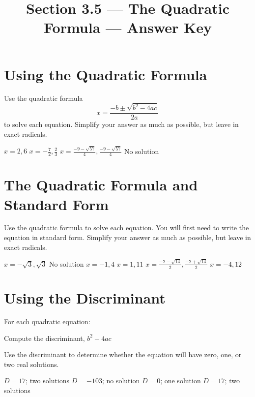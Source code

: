 

\title{Section 3.5 --- The Quadratic Formula --- Answer Key}


\maketitle
\section*{Using the Quadratic Formula}
Use the quadratic formula
\[
x=\frac{-b\pm\sqrt{b^2-4ac}}{2a}
\]
to solve each equation.  Simplify your answer as much as possible, but leave in exact radicals.
\begin{smenum}
\mitemxxxx
{$x=2,6$}
{$x=-\frac{7}{2},\frac{2}{3}$}
{$x=\frac{-9-\sqrt{57}}{4},\frac{-9-\sqrt{57}}{4}$}
{No solution}
\end{smenum}

\section*{The Quadratic Formula and Standard Form}
Use the quadratic formula to solve each equation.  You will first need to write the equation in standard form.  Simplify your answer as much as possible, but leave in exact radicals.
\begin{smenum}
\mitemxxxx
{$x=-\sqrt{3},\sqrt{3}$}
{No solution}
{$x=-1,4$}
{$x=1,11$}
\mitemxx
{$x=\frac{-2-\sqrt{14}}{2},\frac{-2+\sqrt{14}}{2}$}
{$x=-4,12$}
\end{smenum}

\section*{Using the Discriminant}
For each quadratic equation:
\begin{clist}
\item Compute the discriminant, $b^2-4ac$
\item Use the discriminant to determine whether the equation will have zero, one, or two real solutions.
\end{clist}
\begin{smenum}
\mitemxx
{$D=17$; two solutions}
{$D=-103$; no solution}
\mitemxx
{$D=0$; one solution}
{$D=17$; two solutions}
\end{smenum}

